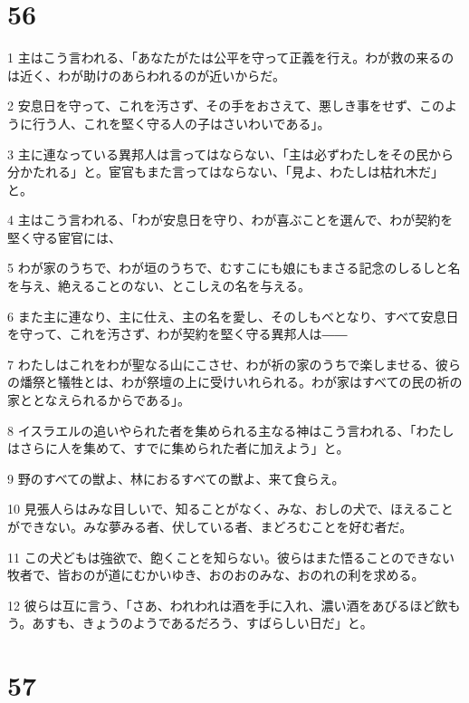 \chapter{56}

\par 1 主はこう言われる、「あなたがたは公平を守って正義を行え。わが救の来るのは近く、わが助けのあらわれるのが近いからだ。
\par 2 安息日を守って、これを汚さず、その手をおさえて、悪しき事をせず、このように行う人、これを堅く守る人の子はさいわいである」。
\par 3 主に連なっている異邦人は言ってはならない、「主は必ずわたしをその民から分かたれる」と。宦官もまた言ってはならない、「見よ、わたしは枯れ木だ」と。
\par 4 主はこう言われる、「わが安息日を守り、わが喜ぶことを選んで、わが契約を堅く守る宦官には、
\par 5 わが家のうちで、わが垣のうちで、むすこにも娘にもまさる記念のしるしと名を与え、絶えることのない、とこしえの名を与える。
\par 6 また主に連なり、主に仕え、主の名を愛し、そのしもべとなり、すべて安息日を守って、これを汚さず、わが契約を堅く守る異邦人は――
\par 7 わたしはこれをわが聖なる山にこさせ、わが祈の家のうちで楽しませる、彼らの燔祭と犠牲とは、わが祭壇の上に受けいれられる。わが家はすべての民の祈の家ととなえられるからである」。
\par 8 イスラエルの追いやられた者を集められる主なる神はこう言われる、「わたしはさらに人を集めて、すでに集められた者に加えよう」と。
\par 9 野のすべての獣よ、林におるすべての獣よ、来て食らえ。
\par 10 見張人らはみな目しいで、知ることがなく、みな、おしの犬で、ほえることができない。みな夢みる者、伏している者、まどろむことを好む者だ。
\par 11 この犬どもは強欲で、飽くことを知らない。彼らはまた悟ることのできない牧者で、皆おのが道にむかいゆき、おのおのみな、おのれの利を求める。
\par 12 彼らは互に言う、「さあ、われわれは酒を手に入れ、濃い酒をあびるほど飲もう。あすも、きょうのようであるだろう、すばらしい日だ」と。

\chapter{57}

